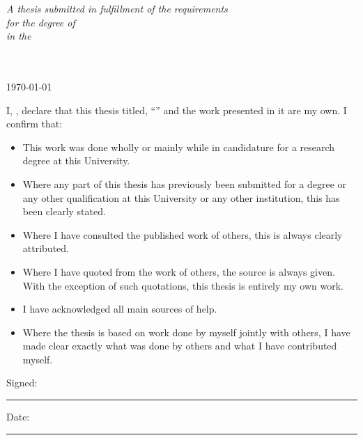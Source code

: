 \documentclass[11pt,english,singlespacing,headsepline]{MastersDoctoralThesis} %
\begin{document}
\begin{titlepage}
\begin{center}
\vfill

\large \textit{A thesis submitted in fulfillment of the requirements\\ for the degree of \degreename}\\[0.3cm] %
\textit{in the}\\[0.4cm]
\groupname\\\deptname\\[2cm] %
 
\vfill

{\large \today}\\[3cm] %
 
\vfill
\end{center}
\end{titlepage}


\begin{declaration}
\addchaptertocentry{\authorshipname} %
\noindent I, \authorname, declare that this thesis titled, \enquote{\ttitle} and the work presented in it are my own. I confirm that:

\begin{itemize} 
\item This work was done wholly or mainly while in candidature for a research degree at this University.
\item Where any part of this thesis has previously been submitted for a degree or any other qualification at this University or any other institution, this has been clearly stated.
\item Where I have consulted the published work of others, this is always clearly attributed.
\item Where I have quoted from the work of others, the source is always given. With the exception of such quotations, this thesis is entirely my own work.
\item I have acknowledged all main sources of help.
\item Where the thesis is based on work done by myself jointly with others, I have made clear exactly what was done by others and what I have contributed myself.\\
\end{itemize}
 
\noindent Signed:\\
\rule[0.5em]{25em}{0.5pt} %
 
\noindent Date:\\
\rule[0.5em]{25em}{0.5pt} %
\end{declaration}
\end{document}
